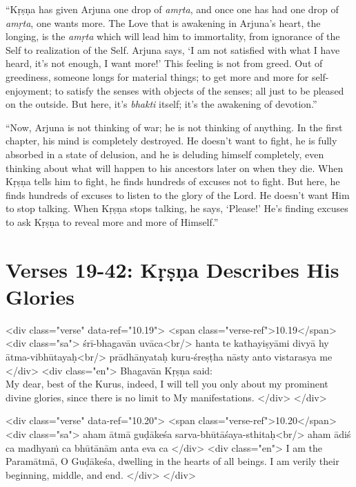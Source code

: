 \enquote{Kṛṣṇa has given Arjuna one drop of \textit{amṛta}, and once one has had one drop of \textit{amṛta}, one wants more. The Love that is awakening in Arjuna’s heart, the longing, is the \textit{amṛta} which will lead him to immortality, from ignorance of the Self to realization of the Self. Arjuna says, \enquote{I am not satisfied with what I have heard, it’s not enough, I want more!} This feeling is not from greed. Out of greediness, someone longs for material things; to get more and more for self-enjoyment; to satisfy the senses with objects of the senses; all just to be pleased on the outside. But here, it’s \textit{bhakti} itself; it’s the awakening of devotion.}

\enquote{Now, Arjuna is not thinking of war; he is not thinking of anything. In the first chapter, his mind is completely destroyed. He doesn’t want to fight, he is fully absorbed in a state of delusion, and he is deluding himself completely, even thinking about what will happen to his ancestors later on when they die. When Kṛṣṇa tells him to fight, he finds hundreds of excuses not to fight. But here, he finds hundreds of excuses to listen to the glory of the Lord. He doesn’t want Him to stop talking. When Kṛṣṇa stops talking, he says, \enquote{Please!} He’s finding excuses to ask Kṛṣṇa to reveal more and more of Himself.}

\section{Verses 19-42: Kṛṣṇa Describes His Glories}\label{sec-verses-19-42-krsna-describes-his-glories}


\begin{html}
<div class="verse" data-ref="10.19">
  <span class="verse-ref">10.19</span>
  <div class="sa">
    śrī-bhagavān uvāca<br/>
    hanta te kathayiṣyāmi divyā hy ātma-vibhūtayaḥ<br/>
    prādhānyataḥ kuru-śreṣṭha nāsty anto vistarasya me
  </div>
  <div class="en">
    \hspace*{1em}Bhagavān Kṛṣṇa said: \\ My dear, best of the Kurus, indeed, I will tell you only about my prominent divine glories, since there is no limit to My manifestations.
  </div>
</div>
\end{html}



\begin{html}
<div class="verse" data-ref="10.20">
  <span class="verse-ref">10.20</span>
  <div class="sa">
    aham ātmā guḍākeśa sarva-bhūtāśaya-sthitaḥ<br/>
    aham ādiś ca madhyaṁ ca bhūtānām anta eva ca
  </div>
  <div class="en">
    I am the Paramātmā, O Guḍākeśa, dwelling in the hearts of all beings. I am verily their beginning, middle, and end.
  </div>
</div>
\end{html}



